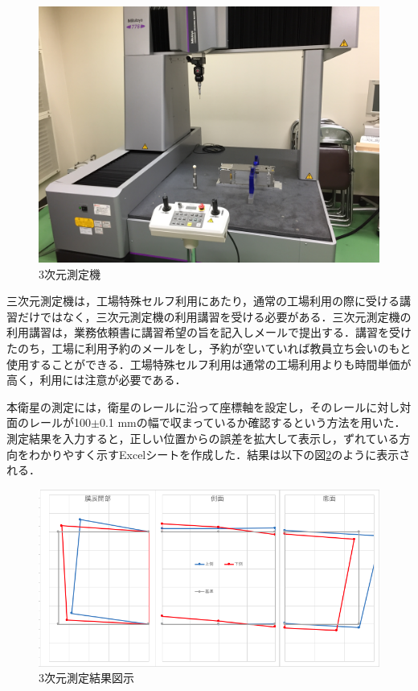 \begin{figure}[h]
	\begin{center}
		
		\includegraphics[width=0.6\linewidth]{04/fig/3dmeasurementmashine.JPG}
		\caption{3次元測定機}
		\label{fig:3dmeasurementmachine}
		
	\end{center}
\end{figure}

三次元測定機は，工場特殊セルフ利用にあたり，通常の工場利用の際に受ける講習だけではなく，三次元測定機の利用講習を受ける必要がある．三次元測定機の利用講習は，業務依頼書に講習希望の旨を記入しメールで提出する．講習を受けたのち，工場に利用予約のメールをし，予約が空いていれば教員立ち会いのもと使用することができる．工場特殊セルフ利用は通常の工場利用よりも時間単価が高く，利用には注意が必要である．

本衛星の測定には，衛星のレールに沿って座標軸を設定し，そのレールに対し対面のレールが100$\pm$0.1 mmの幅で収まっているか確認するという方法を用いた．測定結果を入力すると，正しい位置からの誤差を拡大して表示し，ずれている方向をわかりやすく示すExcelシートを作成した．結果は以下の図\ref{fig:3dmeasurementresult}のように表示される．

\begin{figure}[h]
	\begin{center}
		
		\includegraphics[width=0.8\linewidth]{04/fig/3dmeasurementresult.png}
		\caption{3次元測定結果図示}
		\label{fig:3dmeasurementresult}
		
	\end{center}
\end{figure}


